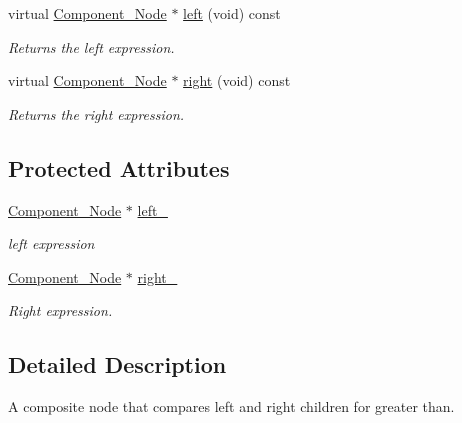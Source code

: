 \begin{DoxyCompactItemize}
virtual \hyperlink{classMadara_1_1Expression__Tree_1_1Component__Node}{Component\_\-Node} $\ast$ \hyperlink{classMadara_1_1Expression__Tree_1_1Composite__Binary__Node_a6ca5cccbc46ccc6026c18f9665298380}{left} (void) const 
\begin{DoxyCompactList}\small\item\em Returns the left expression. \item\end{DoxyCompactList}\item 
virtual \hyperlink{classMadara_1_1Expression__Tree_1_1Component__Node}{Component\_\-Node} $\ast$ \hyperlink{classMadara_1_1Expression__Tree_1_1Composite__Unary__Node_ade55cde5707e0fa73ab1c019159b9aec}{right} (void) const 
\begin{DoxyCompactList}\small\item\em Returns the right expression. \item\end{DoxyCompactList}\end{DoxyCompactItemize}
\subsection*{Protected Attributes}
\begin{DoxyCompactItemize}
\item 
\hyperlink{classMadara_1_1Expression__Tree_1_1Component__Node}{Component\_\-Node} $\ast$ \hyperlink{classMadara_1_1Expression__Tree_1_1Composite__Binary__Node_acac60a70beb2484737e6e7161edb2d1b}{left\_\-}
\begin{DoxyCompactList}\small\item\em left expression \item\end{DoxyCompactList}\item 
\hyperlink{classMadara_1_1Expression__Tree_1_1Component__Node}{Component\_\-Node} $\ast$ \hyperlink{classMadara_1_1Expression__Tree_1_1Composite__Unary__Node_a077b7bd1b52df6f5c6adfde735556a68}{right\_\-}
\begin{DoxyCompactList}\small\item\em Right expression. \item\end{DoxyCompactList}\end{DoxyCompactItemize}


\subsection{Detailed Description}
A composite node that compares left and right children for greater than. 

